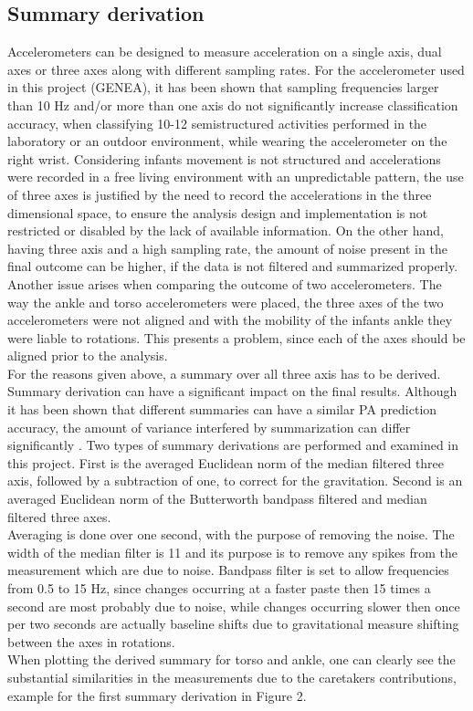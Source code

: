 \documentclass{article}
\begin{document}
{\subsection{Summary derivation}
Accelerometers can be designed to measure acceleration on a single axis, dual axes or three axes along with different sampling rates. For the accelerometer used in this project (GENEA), it has been shown that sampling frequencies larger than 10 Hz and/or more than one axis do not significantly increase classification accuracy, when classifying 10-12 semistructured activities performed in the laboratory or an outdoor environment, while wearing the accelerometer on the right wrist\cite{ref7}. Considering infants movement is not structured and accelerations were recorded in a free living environment with an unpredictable pattern, the use of three axes is justified by the need to record the accelerations in the three dimensional space, to ensure the analysis design and implementation is not restricted or disabled by the lack of available information. On the other hand, having three axis and a high sampling rate, the amount of noise present in the final outcome can be higher, if the data is not filtered and summarized properly. Another issue arises when comparing the outcome of two accelerometers. The way the ankle and torso accelerometers were placed, the three axes of the two accelerometers were not aligned and with the mobility of the infants ankle they were liable to rotations. This presents a problem, since each of the axes should be aligned prior to the analysis.\\
For the reasons given above, a summary over all three axis has to be derived. Summary derivation can have a significant impact on the final results. Although it has been shown that different summaries can have a similar PA prediction accuracy, the amount of variance interfered by summarization can differ significantly \cite{ref3}.
Two types of summary derivations are performed and examined in this project. First is the averaged Euclidean norm of the median filtered three axis, followed by a subtraction of one, to correct for the gravitation. Second is an averaged Euclidean norm of the Butterworth bandpass filtered and median filtered three axes.\\
Averaging is done over one second, with the purpose of removing the noise. The width of the median filter is 11 and its purpose is to remove any spikes from the measurement which are due to noise. Bandpass filter is set to allow frequencies from 0.5 to 15 Hz, since changes occurring at a faster paste then 15 times a second are most probably due to noise, while changes occurring slower then once per two seconds are actually baseline shifts due to gravitational measure shifting between the axes in rotations.\\ When plotting the derived summary for torso and ankle, one can clearly see the substantial similarities in the measurements due to the caretakers contributions, example for the first summary derivation in Figure 2. 
}
\end{document}
